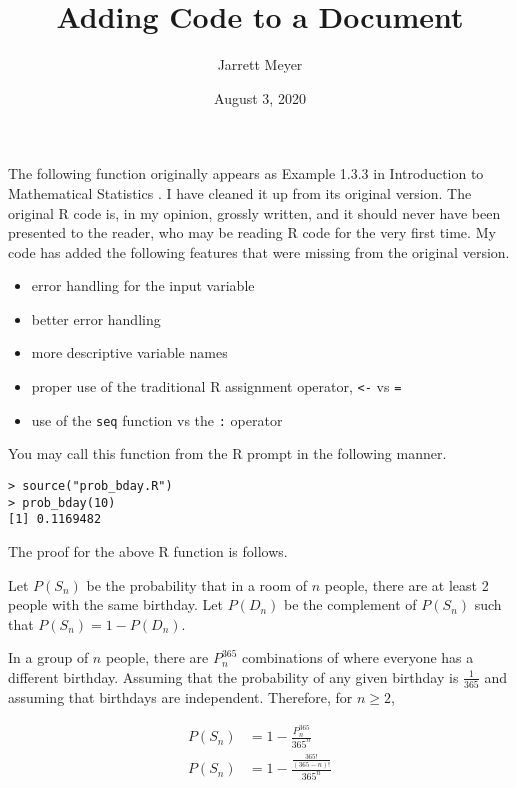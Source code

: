 \documentclass{article}
\title{Adding Code to a Document}
\author{Jarrett Meyer}
\date{August 3, 2020}
\begin{document}
\maketitle

The following function originally appears as Example 1.3.3 in Introduction to Mathematical Statistics \cite{Hogg2019}. I have cleaned it up from its original version. The original R code is, in my opinion, grossly written, and it should never have been presented to the reader, who may be reading R code for the very first time. My code has added the following features that were missing from the original version.

\begin{itemize}
	\item error handling for the input variable
	\item better error handling
	\item more descriptive variable names
	\item proper use of the traditional R assignment operator, \texttt{<-} vs \texttt{=}
	\item use of the \texttt{seq} function vs the \texttt{:} operator
\end{itemize}



You may call this function from the R prompt in the following manner.

\begin{lstlisting}[style={custom-r}]
> source("prob_bday.R")
> prob_bday(10)
[1] 0.1169482
\end{lstlisting}

The proof for the above R function is follows.

Let $P(S_n)$ be the probability that in a room of $n$ people, there are at least 2 people with the same birthday. Let $P(D_n)$ be the complement of $P(S_n)$ such that $P(S_n) = 1 - P(D_n)$.

In a group of $n$ people, there are $P^{365}_n$ combinations of where everyone has a different birthday. Assuming that the probability of any given birthday is $\frac{1}{365}$ and assuming that birthdays are independent. Therefore, for $n \geq 2$,

\begin{align*}
	P(S_n) &= 1 - \frac{P^{365}_n}{365^n} \\
	P(S_n) &= 1 - \frac{\frac{365!}{(365 - n)!}}{365^n}
\end{align*}
\end{document}
